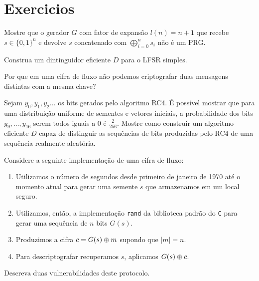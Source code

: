\section{Exercicios}
\label{sec:exercicios}

\begin{exercicio}
Mostre que o gerador $G$ com fator de expansão $l(n) = n + 1$ que recebe $s \in \{0,1\}^n$ e devolve $s$ concatenado com $\bigoplus_{i=0}^ns_i$ não é um PRG.  
\end{exercicio}

\begin{exercicio}
  Construa um dintinguidor eficiente $D$ para o LFSR simples.
\end{exercicio}

\begin{exercicio}
  Por que em uma cifra de fluxo não podemos criptografar duas mensagens distintas com a mesma chave?
\end{exercicio}

\begin{exercicio}
 Sejam $y_0, y_1, y_2 \dots$ os bits gerados pelo algoritmo RC4.
É possível mostrar que para uma distribuição uniforme de sementes e vetores iniciais, a probabilidade dos bits $y_9, \dots, y_{16}$ serem todos iguais a $0$ é $\frac{2}{256}$.
Mostre como construir um algoritmo eficiente $D$ capaz de distinguir as sequências de bits produzidas pelo RC4 de uma sequência realmente aleatória.
\end{exercicio}

\begin{exercicio}
  Considere a seguinte implementação de uma cifra de fluxo:
\begin{enumerate}
\item Utilizamos o número de segundos desde primeiro de janeiro de 1970 até o momento atual para gerar uma semente $s$ que armazenamos em um local seguro.
\item Utilizamos, então, a implementação {\tt rand} da biblioteca padrão do {\tt C} para gerar uma sequência de $n$ bits $G(s)$.
\item Produzimos a cifra $c = G(s) \oplus m$ supondo que $|m| = n$.
\item Para descriptografar recuperamos $s$, aplicamos $G(s) \oplus c$.
\end{enumerate}

  Descreva duas vulnerabilidades deste protocolo.
\end{exercicio}
